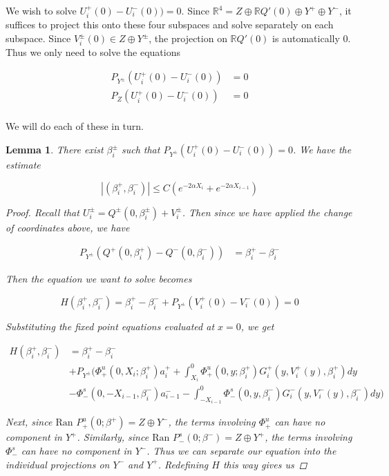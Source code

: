 \documentclass[12pt]{article}
\def\R{{\mathbb R}}
\newtheorem{lemma}{Lemma}
\begin{document}
We wish to solve $U_i^+(0) - U_i^-(0)) = 0$. Since $\R^4 = Z \oplus \R Q'(0) \oplus Y^+ \oplus Y^-$, it suffices to project this onto these four subspaces and solve separately on each subspace. Since $V_i^\pm(0) \in Z \oplus Y^\pm$, the projection on $\R Q'(0)$ is automatically 0. Thus we only need to solve the equations

\begin{align*}
P_{Y^\pm}(U_i^+(0) - U_i^-(0)) &= 0 \\
P_Z(U_i^+(0) - U_i^-(0)) &= 0 \\
\end{align*}

We will do each of these in turn.

\begin{lemma}\label{solveforbeta}
There exist $\beta_i^\pm$ such that $P_{Y^\pm}(U_i^+(0) - U_i^-(0)) = 0$. We have the estimate

\begin{equation}
| (\beta_i^+, \beta_i^-) | \leq C (e^{-2 \alpha X_i} + e^{-2 \alpha X_{i-1}})
\end{equation}

\begin{proof}
Recall that $U_i^\pm = Q^\pm(0, \beta_i^\pm) + V_i^\pm$. Then since we have applied the change of coordinates above, we have

\begin{align*}
P_{Y^\pm}(Q^+(0, \beta_i^+) - Q^-(0, \beta_i^-)) &= \beta_i^+ - \beta_i^-
\end{align*}

Then the equation we want to solve becomes

\begin{equation}
H(\beta_i^+, \beta_i^-) = \beta_i^+ - \beta_i^- 
+ P_{Y^\pm}(V_i^+(0) - V_i^-(0)) = 0
\end{equation}

Substituting the fixed point equations evaluated at $x = 0$, we get

\begin{align*}
H(\beta_i^+, \beta_i^-) &= \beta_i^+ - \beta_i^- \\
&+ P_{Y^\pm} \Big( \Phi^u_+(0, X_i; \beta_i^+) a_i^+ 
+ \int_{X_i}^0 \Phi_+^u(0, y; \beta_i^+) G_i^+(y, V_i^+(y),\beta_i^+)dy \\
&- \Phi^s_-(0, -X_{i-1}, \beta_i^-) a_{i-1}^- 
- \int_{-X_{i-1}}^0 \Phi_-^s(0, y, \beta_i^-) G_i^-(y, V_i^-(y),\beta_i^-) dy \Big) 
\end{align*}

Next, since $\text{Ran }P_+^u(0; \beta^+) = Z \oplus Y^-$, the terms involving $\Phi^u_+$ can have no component in $Y^+$. Similarly, since $\text{Ran }P_-^s(0; \beta^-) = Z \oplus Y^+$, the terms involving $\Phi^s_-$ can have no component in $Y^-$. Thus we can separate our equation into the individual projections on $Y^-$ and $Y^+$. Redefining $H$ this way gives us


\end{proof}
\end{lemma}
\end{document}
